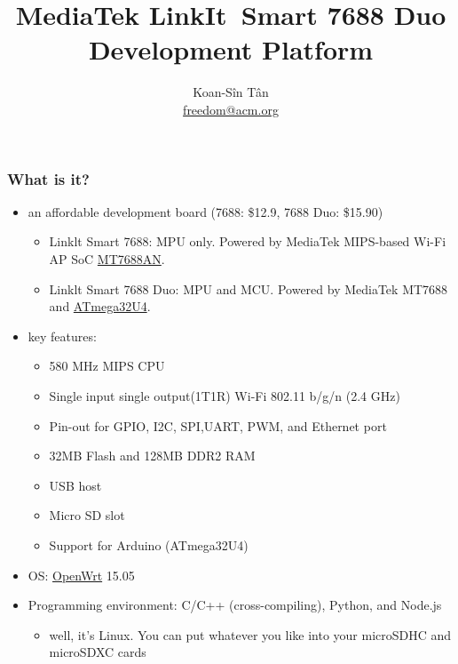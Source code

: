 \documentclass{beamer}
\begin{document}
\title{MediaTek LinkIt\texttrademark\ Smart 7688 Duo Development Platform}
\author[freedom]{Koan-S\^in T\^an \\ \href{mailto:freedom@acm.org}{freedom@acm.org}}

\begin{frame}
  \titlepage
\end{frame}

\begin{frame}
  \frametitle{What is it?}
  \begin{itemize}
  \item an affordable development board (7688: \$12.9, 7688 Duo: \$15.90)
    \begin{itemize}
    \item Linklt Smart 7688: MPU only. Powered by MediaTek MIPS-based Wi-Fi AP SoC \href{http://labs.mediatek.com/fileMedia/download/9ef51e98-49b1-489a-b27e-391bac9f7bf3}{MT7688AN}.
    \item Linklt Smart 7688 Duo: MPU and MCU. Powered by MediaTek MT7688 and \href{http://www.atmel.com/devices/atmega32u4.aspx}{ATmega32U4}.
    \end{itemize}
  \item key features:
    \begin{itemize}
    \item 580 MHz MIPS CPU
    \item Single input single output(1T1R) Wi-Fi 802.11 b/g/n (2.4 GHz)
    \item Pin-out for GPIO, I2C, SPI,UART, PWM, and Ethernet port
    \item 32MB Flash and 128MB DDR2 RAM
    \item USB host
    \item Micro SD slot
    \item Support for Arduino (ATmega32U4)
    \end{itemize}
  \item OS: \href{https://openwrt.org/}{OpenWrt} 15.05
  \item Programming environment: C/C++ (cross-compiling), Python, and Node.js
    \begin{itemize}
    \item well, it's Linux. You can put whatever you like into your microSDHC and microSDXC cards
    \end{itemize}
  \end{itemize}
\end{frame}

\begin{frame}
\end{frame}
\end{document}
